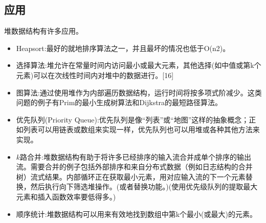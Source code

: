 \subsection{应用}
堆数据结构有许多应用。
\begin{itemize}
\item Heapsort:最好的就地排序算法之一，并且最坏的情况也低于O(n2)。
\item 选择算法:堆允许在常量时间内访问最小或最大元素，其他选择(如中值或第k个元素)可以在次线性时间内对堆中的数据进行。[16]
\item 图算法:通过使用堆作为内部遍历数据结构，运行时间将按多项式阶减少。这类问题的例子有Prim的最小生成树算法和Dijkstra的最短路径算法。
\item 优先队列(Priority Queue):优先队列是像“列表”或“地图”这样的抽象概念；正如列表可以用链表或数组来实现一样，优先队列也可以用堆或各种其他方法来实现。
\item $k$路合并:堆数据结构有助于将许多已经排序的输入流合并成单个排序的输出流。需要合并的例子包括外部排序和来自分布式数据（例如日志结构的合并树）流式结果。内部循环正在获取最小元素，用对应输入流的下一个元素替换，然后执行向下筛选堆操作。(或者替换功能。)(使用优先级队列的提取最大元素和插入函数效率要低得多。)
\item 顺序统计:堆数据结构可以用来有效地找到数组中第k个最小(或最大)的元素。
\end{itemize}

